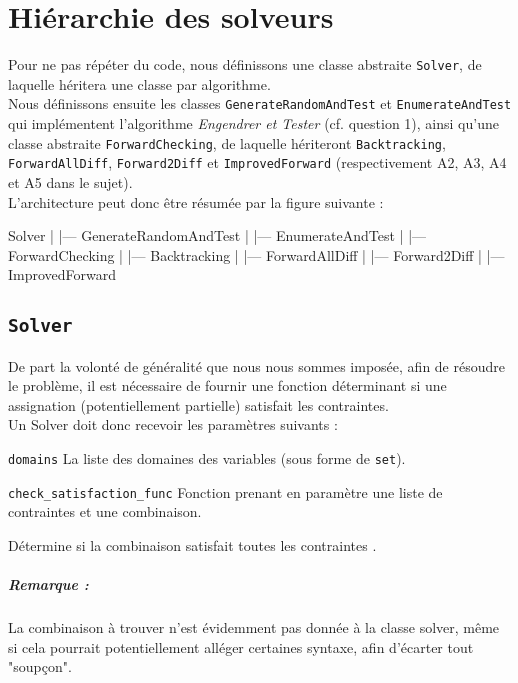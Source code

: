 \documentclass[a4paper, 12pt]{report}
\newcommand{\py}[1]{\texttt{#1}}
\newenvironment{aligneddescription}
	{\begin{tcolorbox}
		\begin{description}[leftmargin=!, labelwidth=\widthof{\bfseries The longest label}]	
	}
	{\end{description}\end{tcolorbox}}
\begin{document}
\section*{Hiérarchie des solveurs}

Pour ne pas répéter du code, nous définissons une classe abstraite \py{Solver}, de laquelle héritera une classe par algorithme. \\

Nous définissons ensuite les classes \py{GenerateRandomAndTest} et \py{EnumerateAndTest} qui implémentent l'algorithme \textit{Engendrer et Tester} (cf. question 1), ainsi qu'une classe abstraite \py{ForwardChecking}, de laquelle hériteront \py{Backtracking}, \py{ForwardAllDiff}, \py{Forward2Diff} et \py{ImprovedForward} (respectivement A2, A3, A4 et A5 dans le sujet). \\

L'architecture peut donc être résumée par la figure suivante :

\begin{pyblock}
Solver
|
|--- GenerateRandomAndTest
|
|--- EnumerateAndTest
|
|--- ForwardChecking
	 |
	 |--- Backtracking
	 |
	 |--- ForwardAllDiff
	 |
	 |--- Forward2Diff
	 |
	 |--- ImprovedForward
\end{pyblock}

\subsection*{\py{Solver}}

De part la volonté de généralité que nous nous sommes imposée, afin de résoudre le problème, il est nécessaire de fournir une fonction déterminant si une assignation (potentiellement partielle) satisfait les contraintes. \\

Un Solver doit donc recevoir les paramètres suivants :

\begin{aligneddescription}
	\item[\py{domains}] La liste des domaines des variables (sous forme de \py{set}).
	
	\item[\py{check_satisfaction_func}] Fonction prenant en paramètre une liste de contraintes et une combinaison.
	
	Détermine si la combinaison satisfait toutes les contraintes .
\end{aligneddescription}

\subparagraph*{Remarque :} La combinaison à trouver n'est évidemment pas donnée à la classe solver, même si cela pourrait potentiellement alléger certaines syntaxe, afin d'écarter tout "soupçon".
\end{document}
